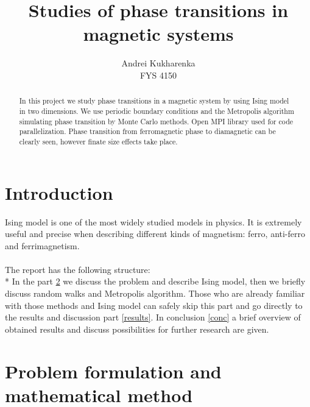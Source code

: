 \documentclass[10pt]{article}
\begin{document}
\setlength\parindent{1pt}
\title{Studies of phase transitions in magnetic systems}
\author{Andrei Kukharenka \\  
FYS 4150 
}

\maketitle
\begin{abstract}
In this project we study phase transitions in a magnetic system by using Ising model in two dimensions.
We use periodic boundary conditions and the Metropolis algorithm simulating phase transition by Monte Carlo methods.
Open MPI library used for code parallelization. Phase transition from ferromagnetic phase to diamagnetic can be clearly seen, however
finate size effects take place.

\end{abstract}
\clearpage 


\section{Introduction}
Ising model is one of the most widely studied models in physics. It is extremely useful and precise when describing different kinds of magnetism: ferro, anti-ferro and ferrimagnetism.\\
 \\

The report has the following structure:\\*
In the part \ref{Part1}  we discuss the problem and describe Ising model, then we briefly discuss random walks and Metropolis algorithm. Those who are already familiar with those methods and Ising model can safely skip this part and go directly to the results and discussion part \ref{results}. In conclusion \ref{conc} a brief overview of obtained results and discuss possibilities for further research are given. 

 

\newpage
\section{Problem formulation and mathematical method}\label{Part1}
\end{document}
